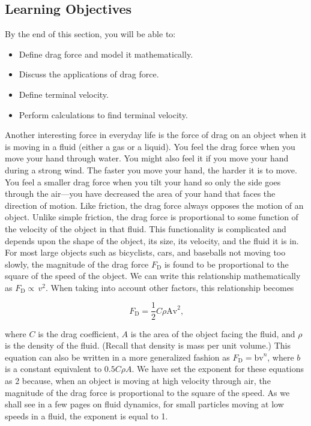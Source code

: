 \documentclass[
]{book}
\providecommand{\tightlist}{%
  \setlength{\itemsep}{0pt}\setlength{\parskip}{0pt}}
\newenvironment{learning-objectives}{}{}
\begin{document}
\hypertarget{import-auto-id0000029}{}
\begin{learning-objectives}

\hypertarget{learning-objectives-21}{%
\subsection{Learning Objectives}\label{learning-objectives-21}}

By the end of this section, you will be able to:

\begin{itemize}
\tightlist
\item
  Define drag force and model it mathematically.
\item
  Discuss the applications of drag force.
\item
  Define terminal velocity.
\item
  Perform calculations to find terminal velocity.
\end{itemize}

\end{learning-objectives}

Another interesting force in everyday life is the force of drag on an
object when it is moving in a fluid (either a gas or a liquid). You feel
the drag force when you move your hand through water. You might also
feel it if you move your hand during a strong wind. The faster you move
your hand, the harder it is to move. You feel a smaller drag force when
you tilt your hand so only the side goes through the air---you have
decreased the area of your hand that faces the direction of motion. Like
friction, the \protect\hypertarget{import-auto-id1165298930276}{}{drag force} always opposes the motion of an object. Unlike simple
friction, the drag force is proportional to some function of the
velocity of the object in that fluid. This functionality is complicated
and depends upon the shape of the object, its size, its velocity, and
the fluid it is in. For most large objects such as bicyclists, cars, and
baseballs not moving too slowly, the magnitude of the drag force
\(F_{\text{D}}{}\) is found to be proportional to the square of the speed
of the object. We can write this relationship mathematically as
\emph{\({F_{\text{D}} \propto \, v^{2}}{}\)}. When taking into account other
factors, this relationship becomes

\leavevmode\hypertarget{eip-871}{}%
\[{{F_{\text{D}} =}\frac{1}{2}C\rho\text{Av}^{2}}{}\text{,}\]

where \(C{}\) is the drag coefficient, \(A{}\) is the area of the object
facing the fluid, and \(\rho{}\) is the density of the fluid. (Recall that
density is mass per unit volume.) This equation can also be written in a
more generalized fashion as \({F_{\text{D}} = \text{bv}^{n}}{}\), where
\(b{}\)\emph{} is a constant equivalent to
\({0\text{.5}{C\rho A}}{}\). We have set the exponent for these equations
as 2 because, when an object is moving at high velocity through air, the
magnitude of the drag force is proportional to the square of the speed.
As we shall see in a few pages on fluid dynamics, for small particles
moving at low speeds in a fluid, the exponent is equal to 1.
\end{document}
